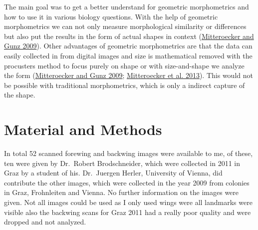 \documentclass[
]{article}
\begin{document}
The main goal was to get a better understand for geometric morphometrics and how to use it in various biology questions. With the help of geometric morphometrics we can not only measure morphological similarity or differences but also put the results in the form of actual shapes in context (\protect\hyperlink{ref-mitteroecker2009}{Mitteroecker and Gunz 2009}). Other advantages of geometric morphometrics are that the data can easily collected in from digital images and size is mathematical removed with the procusters method to focus purely on shape or with size-and-shape we analyze the form (\protect\hyperlink{ref-mitteroecker2009}{Mitteroecker and Gunz 2009}; \protect\hyperlink{ref-mitteroecker2013}{Mitteroecker et al. 2013}). This would not be possible with traditional morphometrics, which is only a indirect capture of the shape.

\hypertarget{material-and-methods}{%
\section{Material and Methods}\label{material-and-methods}}

In total 52 scanned forewing and backwing images were available to me, of these, ten were given by Dr.~Robert Brodschneider, which were collected in 2011 in Graz by a student of his. Dr.~Juergen Herler, University of Vienna, did contribute the other images, which were collected in the year 2009 from colonies in Graz, Frohnleiten and Vienna. No further information on the images were given. Not all images could be used as I only used wings were all landmarks were visible also the backwing scans for Graz 2011 had a really poor quality and were dropped and not analyzed.
\end{document}
